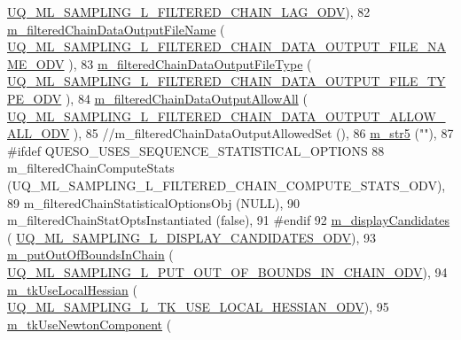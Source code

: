 \begin{DoxyCode}
      \hyperlink{_m_l_sampling_level_options_8h_a820859819bc5ca3c1a924c2113265ede}{UQ\_ML\_SAMPLING\_L\_FILTERED\_CHAIN\_LAG\_ODV}),
82   \hyperlink{class_q_u_e_s_o_1_1_m_l_sampling_level_options_abf333c405ee097104ee9b1b1e92ecd97}{m\_filteredChainDataOutputFileName}          (
      \hyperlink{_m_l_sampling_level_options_8h_ade0cdafc4390a26e89c31c82bd30d39f}{UQ\_ML\_SAMPLING\_L\_FILTERED\_CHAIN\_DATA\_OUTPUT\_FILE\_NAME\_ODV}
      ),
83   \hyperlink{class_q_u_e_s_o_1_1_m_l_sampling_level_options_a154ba7fd5c2fbc98af0ac91bb022a232}{m\_filteredChainDataOutputFileType}          (
      \hyperlink{_m_l_sampling_level_options_8h_a238b4fa1277494fb24da082847695b69}{UQ\_ML\_SAMPLING\_L\_FILTERED\_CHAIN\_DATA\_OUTPUT\_FILE\_TYPE\_ODV}
      ),
84   \hyperlink{class_q_u_e_s_o_1_1_m_l_sampling_level_options_a80471ba2c70d39f2cb7e1ea954fb86b8}{m\_filteredChainDataOutputAllowAll}          (
      \hyperlink{_m_l_sampling_level_options_8h_acdc4131edc310e82d31f97ba6e53d7fe}{UQ\_ML\_SAMPLING\_L\_FILTERED\_CHAIN\_DATA\_OUTPUT\_ALLOW\_ALL\_ODV}
      ),
85 \textcolor{comment}{//m\_filteredChainDataOutputAllowedSet        (),}
86   \hyperlink{class_q_u_e_s_o_1_1_m_l_sampling_level_options_a341ed1186366d5483559298a8c5348d2}{m\_str5}                                     (\textcolor{stringliteral}{""}),
87 \textcolor{preprocessor}{#ifdef QUESO\_USES\_SEQUENCE\_STATISTICAL\_OPTIONS}
88 \textcolor{preprocessor}{}  m\_filteredChainComputeStats                (UQ\_ML\_SAMPLING\_L\_FILTERED\_CHAIN\_COMPUTE\_STATS\_ODV),
89   m\_filteredChainStatisticalOptionsObj       (NULL),
90   m\_filteredChainStatOptsInstantiated        (\textcolor{keyword}{false}),
91 \textcolor{preprocessor}{#endif}
92 \textcolor{preprocessor}{}  \hyperlink{class_q_u_e_s_o_1_1_m_l_sampling_level_options_a975a24a45096ac07b8e3a6cade590bbc}{m\_displayCandidates}                        (
      \hyperlink{_m_l_sampling_level_options_8h_aa2d7745b0e532f8c005622d3ff02b628}{UQ\_ML\_SAMPLING\_L\_DISPLAY\_CANDIDATES\_ODV}),
93   \hyperlink{class_q_u_e_s_o_1_1_m_l_sampling_level_options_acf244c6ea5d1ac9c61d19d1d8f24fd8c}{m\_putOutOfBoundsInChain}                    (
      \hyperlink{_m_l_sampling_level_options_8h_ab15c556d88b36e6e230ec6e1e0d73111}{UQ\_ML\_SAMPLING\_L\_PUT\_OUT\_OF\_BOUNDS\_IN\_CHAIN\_ODV}),
94   \hyperlink{class_q_u_e_s_o_1_1_m_l_sampling_level_options_a981084edf651ff9db5dd56a36ef54a61}{m\_tkUseLocalHessian}                        (
      \hyperlink{_m_l_sampling_level_options_8h_a2d102346b9e51bf71f6714c2eb7a6bee}{UQ\_ML\_SAMPLING\_L\_TK\_USE\_LOCAL\_HESSIAN\_ODV}),
95   \hyperlink{class_q_u_e_s_o_1_1_m_l_sampling_level_options_aa763d458ffbb83ea5be881e9535a2cb5}{m\_tkUseNewtonComponent}                     (

\end{DoxyCode}
